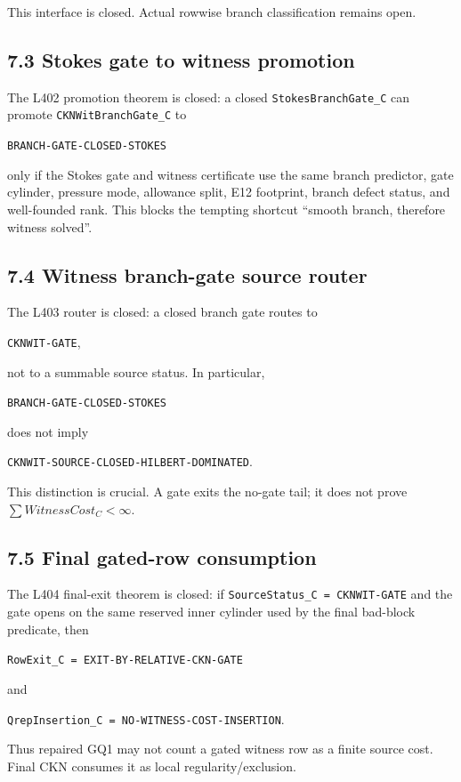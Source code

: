 \documentclass[11pt]{article}
\begin{document}
This interface is closed. Actual rowwise branch classification remains open.

\subsection*{7.3 Stokes gate to witness promotion}

The L402 promotion theorem is closed: a closed \texttt{StokesBranchGate\_C} can promote \texttt{CKNWitBranchGate\_C} to

\texttt{BRANCH-GATE-CLOSED-STOKES}

only if the Stokes gate and witness certificate use the same branch predictor, gate cylinder, pressure mode, allowance split, E12 footprint, branch defect status, and well-founded rank. This blocks the tempting shortcut ``smooth branch, therefore witness solved''.

\subsection*{7.4 Witness branch-gate source router}

The L403 router is closed: a closed branch gate routes to

\texttt{CKNWIT-GATE},

not to a summable source status. In particular,

\texttt{BRANCH-GATE-CLOSED-STOKES}

does not imply

\texttt{CKNWIT-SOURCE-CLOSED-HILBERT-DOMINATED}.

This distinction is crucial. A gate exits the no-gate tail; it does not prove \(\sum WitnessCost_C<\infty\).

\subsection*{7.5 Final gated-row consumption}

The L404 final-exit theorem is closed: if \texttt{SourceStatus\_C\ =\ CKNWIT-GATE} and the gate opens on the same reserved inner cylinder used by the final bad-block predicate, then

\texttt{RowExit\_C\ =\ EXIT-BY-RELATIVE-CKN-GATE}

and

\texttt{QrepInsertion\_C\ =\ NO-WITNESS-COST-INSERTION}.

Thus repaired GQ1 may not count a gated witness row as a finite source cost. Final CKN consumes it as local regularity/exclusion.
\end{document}
